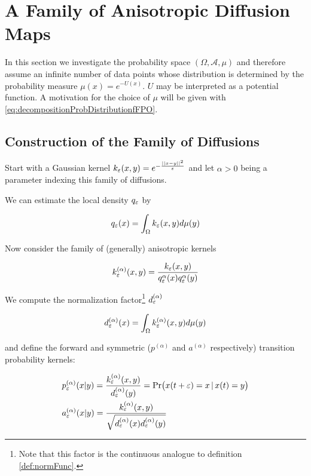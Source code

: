 \section{A Family of Anisotropic Diffusion Maps}

In this section we investigate the probability space $(\Omega, \mathcal{A}, \mu)$ and therefore assume an infinite number of data points whose distribution is determined by the probability measure $\mu(x)=e^{-U(x)}$. $U$ may be interpreted as a potential function. A motivation for the choice of $\mu$ will be given with \eqref{eq:decompositionProbDistributionfFPO}.

\subsection{Construction of the Family of Diffusions}
Start with a Gaussian kernel $k_\varepsilon(x,y)=e^{-\frac{||x-y||^2}{\varepsilon}}$ and let $\alpha > 0$ being a parameter indexing this family of diffusions.

We can estimate the local density $q_\varepsilon$ by 

\begin{definition}
$$q_\varepsilon(x)=\int_\Omega k_\varepsilon(x,y)d\mu(y)$$
\end{definition}

Now consider the family of (generally) anisotropic kernels

\begin{definition}
$$k_\varepsilon^{(\alpha)}(x,y)=\frac{k_\varepsilon(x,y)}{q_\varepsilon^\alpha(x)q_\varepsilon^\alpha(y)} $$
\end{definition}

We compute the normalization factor\footnote{Note that this factor is the continuous analogue to definition \ref{def:normFunc}.} $d_\varepsilon^{(\alpha)}$

$$d_\varepsilon^{(\alpha)}(x) = \int_\Omega k_\varepsilon^{(\alpha)}(x,y)d\mu(y)$$

and define the forward and symmetric ($p^{(\alpha)}$ and $a^{(\alpha)}$ respectively) transition probability kernels:

\begin{definition}\begin{equation*}\begin{aligned}
&p_\varepsilon^{(\alpha)}(x|y) = \frac{k_\varepsilon^{(\alpha)}(x,y)}{d_\varepsilon^{(\alpha)}(y)} = \text{Pr}\big(x(t+\varepsilon)=x \, |\, x(t)=y\big)\\
&a_\varepsilon^{(\alpha)}(x|y) = \frac{k_\varepsilon^{(\alpha)}(x,y)}{\sqrt{d_\varepsilon^{(\alpha)}(x)d_\varepsilon^{(\alpha)}(y)}}
\end{aligned}\end{equation*}\end{definition}

